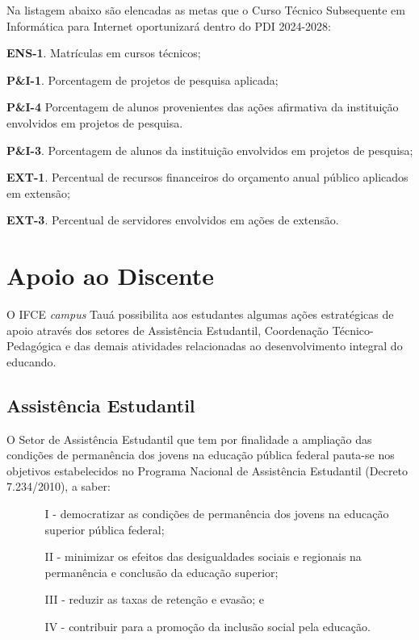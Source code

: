 \documentclass[
	12pt,				%
	openright,			%
	twoside,			%
	a4paper,			%
	chapter=TITLE,		%
	english,			%
	french,				%
	spanish,			%
	brazil,				%
	]{abntex2}
\begin{document}
Na listagem abaixo  são elencadas as metas que o  Curso Técnico Subsequente em
Informática para Internet oportunizará dentro do PDI 2024-2028:
\begin{alineas}
\item \textbf{ENS-1}. 
Matrículas em cursos
técnicos;
	\item \textbf{P\&I-1}.
Porcentagem de projetos
de pesquisa aplicada;
\item \textbf{P\&I-4}
Porcentagem de alunos
provenientes das ações
afirmativa da instituição
envolvidos em projetos de
pesquisa. 
	\item \textbf{P\&I-3}. Porcentagem de alunos da
instituição envolvidos em
projetos de pesquisa;
\item \textbf{EXT-1}.
Percentual de recursos
financeiros do orçamento
anual público aplicados em
extensão;
	\item  \textbf{EXT-3}.
Percentual de servidores
envolvidos em ações de
extensão.
\end{alineas}



\chapter{Apoio ao Discente}
O IFCE \textit{campus} Tauá possibilita aos estudantes algumas ações estratégicas de apoio através dos setores de Assistência Estudantil, Coordenação Técnico-Pedagógica e das demais atividades relacionadas ao desenvolvimento integral do educando.


\section{Assistência Estudantil}
O  Setor de Assistência Estudantil que tem por finalidade a ampliação das condições de permanência dos jovens na educação pública federal pauta-se nos objetivos estabelecidos no Programa Nacional de Assistência Estudantil (Decreto 7.234/2010), a saber:
\begin{itemize}
\item[]
\begin{itemize}
    \setlength\itemsep{0em}
    \item[I -] democratizar as condições de permanência dos jovens na educação superior pública federal;
    \item[II -] minimizar os efeitos das desigualdades sociais e regionais na permanência e conclusão da educação superior;
    \item[III -] reduzir as taxas de retenção e evasão; e
    \item[IV -] contribuir para a promoção da inclusão social pela educação.
\end{itemize}
\end{itemize}
\end{document}
